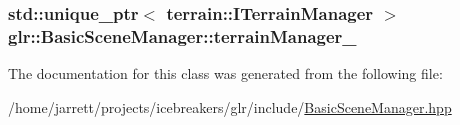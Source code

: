 \hypertarget{classglr_1_1BasicSceneManager_afd1b9259e9ddad070f593ea3ad41b7c1}{
\subsubsection[{terrain\-Manager\-\_\-}]{\setlength{\rightskip}{0pt plus 5cm}std\-::unique\-\_\-ptr$<$ {\bf terrain\-::\-I\-Terrain\-Manager} $>$ glr\-::\-Basic\-Scene\-Manager\-::terrain\-Manager\-\_\-\hspace{0.3cm}{\ttfamily [protected]}}}\label{classglr_1_1BasicSceneManager_afd1b9259e9ddad070f593ea3ad41b7c1}


The documentation for this class was generated from the following file\-:\begin{DoxyCompactItemize}
\item 
/home/jarrett/projects/icebreakers/glr/include/\hyperlink{BasicSceneManager_8hpp}{Basic\-Scene\-Manager.\-hpp}\end{DoxyCompactItemize}
